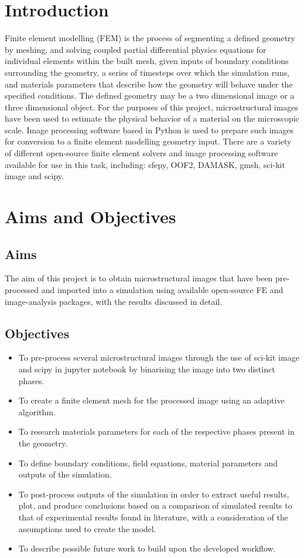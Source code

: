 \documentclass[\report.tex]{subfiles}
\begin{document}
\section{Introduction}
Finite element modelling (FEM) is the process of segmenting a defined geometry by meshing, and solving coupled partial differential physics equations for individual elements within the built mesh, given inputs of boundary conditions surrounding the geometry, a series of timesteps over which the simulation runs, and materials parameters that describe how the geometry will behave under the specified conditions. The defined geometry may be a two dimensional image or a three dimensional object. For the purposes of this project, microstructural images have been used to estimate the physical behavior of a material on the microscopic scale. Image processing software based in Python is used to prepare such images for conversion to a finite element modelling geometry input. There are a variety of different open-source finite element solvers and image processing software available for use in this task, including: sfepy, OOF2, DAMASK, gmsh, sci-kit image and scipy.

\section{Aims and Objectives}
\subsection{Aims}

\noindent The aim of this project is to obtain microstructural images that have been pre-processed and imported into a simulation using available open-source FE and image-analysis packages, with the results discussed in detail.

\subsection{Objectives}

\begin{itemize}
  \item To pre-process several microstructural images through the use of sci-kit image and scipy in jupyter notebook by binarising the image into two distinct phases.
  \item To create a finite element mesh for the processed image using an adaptive algorithm.
  \item To research materials parameters for each of the respective phases present in the geometry.
  \item To define boundary conditions, field equations, material parameters and outputs of the simulation.
  \item To post-process outputs of the simulation in order to extract useful results, plot, and produce conclusions based on a comparison of simulated results to that of experimental results found in literature, with a consideration of the assumptions used to create the model.
  \item To describe possible future work to build upon the developed workflow.
\end{itemize}
\end{document}

